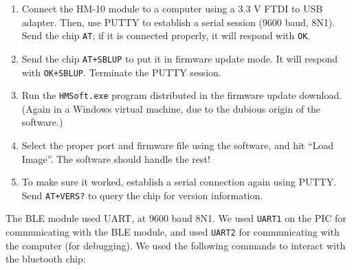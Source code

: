 \documentclass[]{article}
\begin{document}
\begin{enumerate}
\item
  Connect the HM-10 module to a computer using a 3.3 V FTDI to USB
  adapter. Then, use PUTTY to establish a serial session (9600 baud,
  8N1). Send the chip \texttt{AT}; if it is connected properly, it will
  respond with \texttt{OK}.
\item
  Send the chip \texttt{AT+SBLUP} to put it in firmware update mode. It
  will respond with \texttt{OK+SBLUP}. Terminate the PUTTY session.
\item
  Run the \texttt{HMSoft.exe} program distributed in the firmware update
  download. (Again in a Windows virtual machine, due to the dubious origin of the software.)
\item
  Select the proper port and firmware file using the software, and hit
  ``Load Image''. The software should handle the rest!
\item
  To make sure it worked, establish a serial connection again using
  PUTTY. Send \texttt{AT+VERS?} to query the chip for version
  information.
\end{enumerate}

The BLE module used UART, at 9600 baud 8N1. We used \texttt{UART1} on
the PIC for communicating with the BLE module, and used \texttt{UART2}
for communicating with the computer (for debugging).
We used the following commands to interact with the bluetooth chip:

\end{document}
